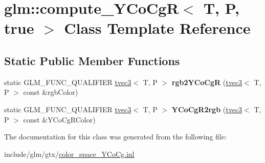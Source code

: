 \hypertarget{classglm_1_1compute__YCoCgR_3_01T_00_01P_00_01true_01_4}{}\section{glm\+:\+:compute\+\_\+\+Y\+Co\+CgR$<$ T, P, true $>$ Class Template Reference}
\label{classglm_1_1compute__YCoCgR_3_01T_00_01P_00_01true_01_4}
\subsection*{Static Public Member Functions}
\begin{DoxyCompactItemize}
\item 
\mbox{\label{classglm_1_1compute__YCoCgR_3_01T_00_01P_00_01true_01_4_a82803505194346c9a8d9d17d770a8c45}} 
static G\+L\+M\+\_\+\+F\+U\+N\+C\+\_\+\+Q\+U\+A\+L\+I\+F\+I\+ER \hyperlink{structglm_1_1tvec3}{tvec3}$<$ T, P $>$ {\bfseries rgb2\+Y\+Co\+CgR} (\hyperlink{structglm_1_1tvec3}{tvec3}$<$ T, P $>$ const \&rgb\+Color)
\item 
\mbox{\label{classglm_1_1compute__YCoCgR_3_01T_00_01P_00_01true_01_4_a06da2d71b6b47d04e9579eef10022cbb}} 
static G\+L\+M\+\_\+\+F\+U\+N\+C\+\_\+\+Q\+U\+A\+L\+I\+F\+I\+ER \hyperlink{structglm_1_1tvec3}{tvec3}$<$ T, P $>$ {\bfseries Y\+Co\+Cg\+R2rgb} (\hyperlink{structglm_1_1tvec3}{tvec3}$<$ T, P $>$ const \&Y\+Co\+Cg\+R\+Color)
\end{DoxyCompactItemize}


The documentation for this class was generated from the following file\+:\begin{DoxyCompactItemize}
\item 
include/glm/gtx/\hyperlink{color__space__YCoCg_8inl}{color\+\_\+space\+\_\+\+Y\+Co\+Cg.\+inl}\end{DoxyCompactItemize}
